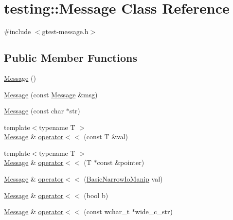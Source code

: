 \hypertarget{classtesting_1_1_message}{}\section{testing\+::Message Class Reference}
\label{classtesting_1_1_message}


{\ttfamily \#include $<$gtest-\/message.\+h$>$}

\subsection*{Public Member Functions}
\begin{DoxyCompactItemize}
\item 
\mbox{\hyperlink{classtesting_1_1_message_af5ba7216630df9845f18feb64b1a5383}{Message}} ()
\item 
\mbox{\hyperlink{classtesting_1_1_message_ac126e24804817a053bebba0920d94a11}{Message}} (const \mbox{\hyperlink{classtesting_1_1_message}{Message}} \&msg)
\item 
\mbox{\hyperlink{classtesting_1_1_message_a9de694ca239486809fc99fbbea8ac21d}{Message}} (const char $\ast$str)
\item 
{\footnotesize template$<$typename T $>$ }\\\mbox{\hyperlink{classtesting_1_1_message}{Message}} \& \mbox{\hyperlink{classtesting_1_1_message_a2e0e71be52d54c20a75a55fca812721f}{operator$<$$<$}} (const T \&val)
\item 
{\footnotesize template$<$typename T $>$ }\\\mbox{\hyperlink{classtesting_1_1_message}{Message}} \& \mbox{\hyperlink{classtesting_1_1_message_aa3ab685879958f90d2d8cd5b68d10c34}{operator$<$$<$}} (T $\ast$const \&pointer)
\item 
\mbox{\hyperlink{classtesting_1_1_message}{Message}} \& \mbox{\hyperlink{classtesting_1_1_message_a3a71a1c1c8ea52de5852d75483d41453}{operator$<$$<$}} (\mbox{\hyperlink{classtesting_1_1_message_ad398b70e2a11b923cef05c809b0eeb92}{Basic\+Narrow\+Io\+Manip}} val)
\item 
\mbox{\hyperlink{classtesting_1_1_message}{Message}} \& \mbox{\hyperlink{classtesting_1_1_message_a3e1e04f23b1bdfe18adfd59928296346}{operator$<$$<$}} (bool b)
\item 
\mbox{\hyperlink{classtesting_1_1_message}{Message}} \& \mbox{\hyperlink{classtesting_1_1_message_ac0db9c22535b28bc863bfd0a1fdf7e14}{operator$<$$<$}} (const wchar\+\_\+t $\ast$wide\+\_\+c\+\_\+str)
\item 

\end{DoxyCompactItemize}
